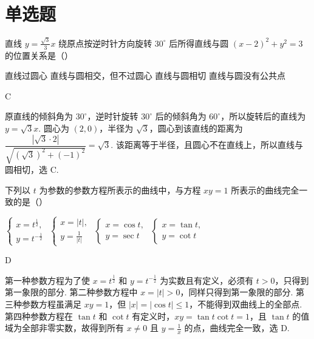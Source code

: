 \section{单选题}

\begin{problem}
直线 \(y=\frac{\sqrt{3}}{3}x \) 绕原点按逆时针方向旋转 \(30^{\circ} \) 后所得直线与圆 \((x-2)^{2}+y^{2}=3 \) 的位置关系是（\quad）

\choices
    {直线过圆心}
    {直线与圆相交，但不过圆心}
    {直线与圆相切}
    {直线与圆没有公共点}
\end{problem}

\begin{answer}
C
\end{answer}

\begin{solution}
原直线的倾斜角为 \(30^{\circ}\)，逆时针旋转 \(30^{\circ}\) 后的倾斜角为 \(60^{\circ}\)，所以旋转后的直线为 \(y=\sqrt3x\). 圆心为 \((2,0)\)，半径为 \(\sqrt3\)，圆心到该直线的距离为
\(\dfrac{|\sqrt3\cdot2|}{\sqrt{(\sqrt3)^2+(-1)^2}}=\sqrt3\). 该距离等于半径，且圆心不在直线上，所以直线与圆相切，选 C.
\end{solution}

\begin{problem}
下列以 \(t\) 为参数的参数方程所表示的曲线中，与方程 \(xy = 1\) 所表示的曲线完全一致的是（\quad）

\choices
    {\(\begin{cases}
        x=t^{\frac{1}{2}},\\
        y=t^{-\frac{1}{2}}
    \end{cases}\)}
    {\(\begin{cases}
        x=|t|,\\
        y=\frac{1}{|t|}
    \end{cases}\)}
    {\(\begin{cases}
        x=\cos t,\\
        y=\sec t
    \end{cases}\)}
    {\(\begin{cases}
        x=\tan t,\\
        y=\cot t
    \end{cases}\)}
\end{problem}

\begin{answer}
D
\end{answer}

\begin{solution}
第一种参数方程为了使 \(x=t^{\frac{1}{2}}\) 和 \(y=t^{-\frac{1}{2}}\) 为实数且有定义，必须有 \(t>0\)，只得到第一象限的部分. 第二种参数方程中 \(x=|t|>0\)，同样只得到第一象限的部分. 第三种参数方程虽满足 \(xy=1\)，但 \(|x|=|\cos t|\leq1\)，不能得到双曲线上的全部点. 第四种参数方程在 \(\tan t\) 和 \(\cot t\) 有定义时，\(xy=\tan t\cot t=1\)，且 \(\tan t\) 的值域为全部非零实数，故得到所有 \(x\ne0\) 且 \(y=\frac{1}{x}\) 的点，曲线完全一致，选 D.
\end{solution}


